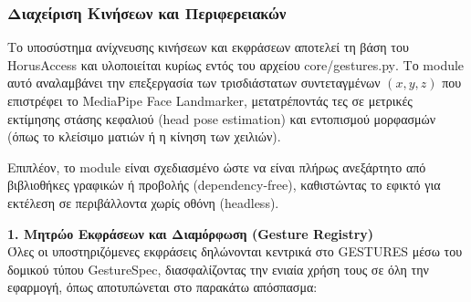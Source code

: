 \documentclass[twoside, a4paper, 11pt]{article}
\newcommand{\textlatin}[1]{\textenglish{#1}}
\begin{document}
\subsubsection{Διαχείριση Κινήσεων και Περιφερειακών}

Το υποσύστημα ανίχνευσης κινήσεων και εκφράσεων αποτελεί τη βάση του \textlatin{HorusAccess} και υλοποιείται κυρίως εντός του αρχείου \textlatin{core/gestures.py}. Το module αυτό αναλαμβάνει την επεξεργασία των τρισδιάστατων συντεταγμένων $(x, y, z)$ που επιστρέφει το \textlatin{MediaPipe Face Landmarker}, μετατρέποντάς τες σε μετρικές εκτίμησης στάσης κεφαλιού (\textlatin{head pose estimation}) και εντοπισμού μορφασμών (όπως το κλείσιμο ματιών ή η κίνηση των χειλιών).

Επιπλέον, το module είναι σχεδιασμένο ώστε να είναι πλήρως ανεξάρτητο από βιβλιοθήκες γραφικών ή προβολής (\textlatin{dependency-free}), καθιστώντας το εφικτό για εκτέλεση σε περιβάλλοντα χωρίς οθόνη (\textlatin{headless}).

\textbf{1. Μητρώο Εκφράσεων και Διαμόρφωση (\textlatin{Gesture Registry})}\\
Όλες οι υποστηριζόμενες εκφράσεις δηλώνονται κεντρικά στο \textlatin{GESTURES} μέσω του δομικού τύπου \textlatin{GestureSpec}, διασφαλίζοντας την ενιαία χρήση τους σε όλη την εφαρμογή, όπως αποτυπώνεται στο παρακάτω απόσπασμα:
\end{document}
